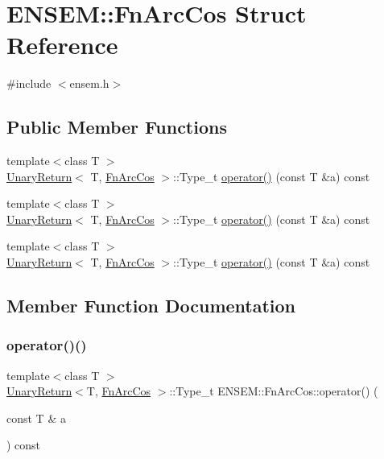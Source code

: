 \hypertarget{structENSEM_1_1FnArcCos}{}\section{E\+N\+S\+EM\+:\+:Fn\+Arc\+Cos Struct Reference}
\label{structENSEM_1_1FnArcCos}


{\ttfamily \#include $<$ensem.\+h$>$}

\subsection*{Public Member Functions}
\begin{DoxyCompactItemize}
\item 
{\footnotesize template$<$class T $>$ }\\\mbox{\hyperlink{structENSEM_1_1UnaryReturn}{Unary\+Return}}$<$ T, \mbox{\hyperlink{structENSEM_1_1FnArcCos}{Fn\+Arc\+Cos}} $>$\+::Type\+\_\+t \mbox{\hyperlink{structENSEM_1_1FnArcCos_a7d507fc5962b17eedfa81873113d0b96}{operator()}} (const T \&a) const
\item 
{\footnotesize template$<$class T $>$ }\\\mbox{\hyperlink{structENSEM_1_1UnaryReturn}{Unary\+Return}}$<$ T, \mbox{\hyperlink{structENSEM_1_1FnArcCos}{Fn\+Arc\+Cos}} $>$\+::Type\+\_\+t \mbox{\hyperlink{structENSEM_1_1FnArcCos_a7d507fc5962b17eedfa81873113d0b96}{operator()}} (const T \&a) const
\item 
{\footnotesize template$<$class T $>$ }\\\mbox{\hyperlink{structENSEM_1_1UnaryReturn}{Unary\+Return}}$<$ T, \mbox{\hyperlink{structENSEM_1_1FnArcCos}{Fn\+Arc\+Cos}} $>$\+::Type\+\_\+t \mbox{\hyperlink{structENSEM_1_1FnArcCos_a7d507fc5962b17eedfa81873113d0b96}{operator()}} (const T \&a) const
\end{DoxyCompactItemize}


\subsection{Member Function Documentation}
\mbox{\label{structENSEM_1_1FnArcCos_a7d507fc5962b17eedfa81873113d0b96}} 
\subsubsection{\texorpdfstring{operator()()}{operator()()}\hspace{0.1cm}{\footnotesize\ttfamily [1/3]}}
{\footnotesize\ttfamily template$<$class T $>$ \\
\mbox{\hyperlink{structENSEM_1_1UnaryReturn}{Unary\+Return}}$<$T, \mbox{\hyperlink{structENSEM_1_1FnArcCos}{Fn\+Arc\+Cos}} $>$\+::Type\+\_\+t E\+N\+S\+E\+M\+::\+Fn\+Arc\+Cos\+::operator() (\begin{DoxyParamCaption}\item[{const T \&}]{a }\end{DoxyParamCaption}) const\hspace{0.3cm}{\ttfamily [inline]}}

